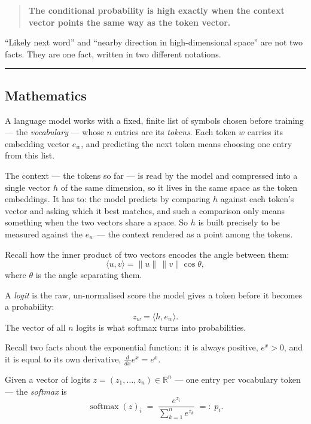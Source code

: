 \documentclass[11pt]{article}
\begin{document}
\begin{quote}
  \textbf{The conditional probability is high exactly when the context vector points the
  same way as the token vector.}
\end{quote}

``Likely next word'' and ``nearby direction in high-dimensional space'' are not two
facts. They are one fact, written in two different notations.

\bigskip
\begin{center}\color{boxrule}\rule{0.42\linewidth}{0.4pt}\end{center}
\bigskip

\subsection*{Mathematics}

A language model works with a
fixed, finite list of symbols chosen before training --- the \emph{vocabulary} --- whose
$n$ entries are its \emph{tokens}. Each token $w$ carries its embedding
vector $e_w$, and predicting the next token means choosing one entry from this list.

The context --- the tokens so far --- is read by the model and compressed into a single
vector $h$ of the same dimension, so it lives in the same space as the token embeddings. It
has to: the model predicts by comparing $h$ against each token's vector and asking which it
best matches, and such a comparison only means something when the two vectors share a space.
So $h$ is built precisely to be measured against the $e_w$ --- the context rendered as a
point among the tokens.

Recall how the inner product of two vectors encodes the angle between them:
\[
  \langle u, v\rangle = \lVert u\rVert\,\lVert v\rVert\cos\theta,
\]
where $\theta$ is the angle separating them.

A \emph{logit} is the raw, un-normalised score the model gives a token before it becomes a
probability:
\[
  z_w = \langle h, e_w\rangle .
\]
The vector of all $n$ logits is what softmax turns into probabilities.

Recall two facts about the exponential function: it is always positive, $e^x > 0$, and it
is equal to its own derivative, $\tfrac{d}{dx}e^x = e^x$.

Given a vector
of logits $z = (z_1, \dots, z_n) \in \mathbb{R}^n$ --- one entry per vocabulary token --- the
\emph{softmax} is
\[
  \operatorname{softmax}(z)_i \;=\; \frac{e^{z_i}}{\sum_{k=1}^{n} e^{z_k}} \;=:\; p_i .
\]
\end{document}
